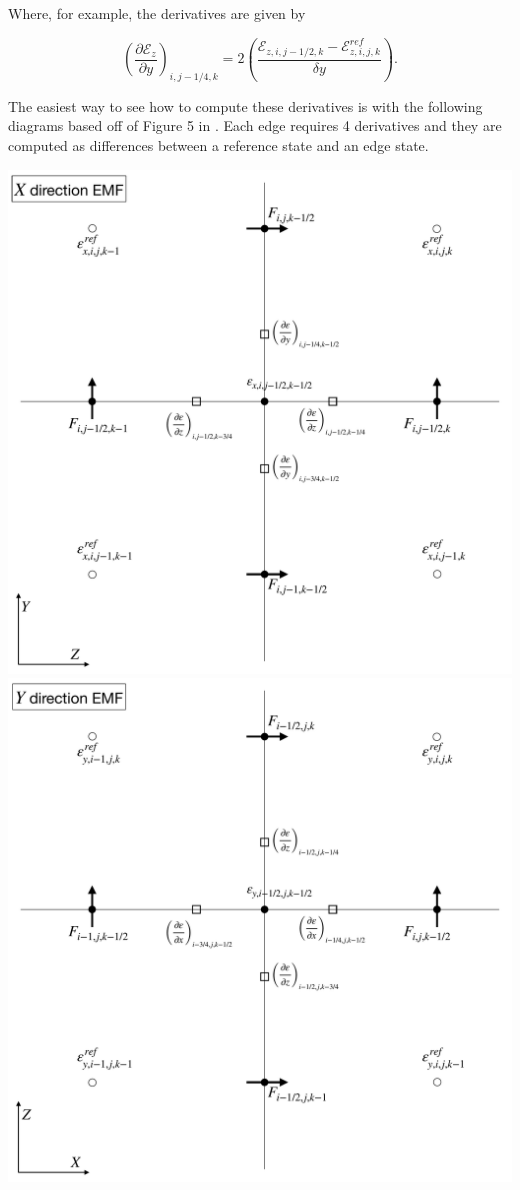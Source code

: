 Where, for example, the derivatives are given by

$$
    \left( \frac{\partial \mathcal{E}_z }{\partial y} \right)_{i, j-1/4, k} =
    2 \left( \frac{\mathcal{E}_{z,i,j-1/2,k} - \mathcal{E}_{z,i,j,k}^{ref}}{\delta y} \right).
$$

The easiest way to see how to compute these derivatives is with the following diagrams based off of Figure 5 in \citeyear[Stone et al.][]{stone_athena_2008}. Each edge requires 4 derivatives and they are computed as differences between a reference state and an edge state.

\includegraphics[scale=0.25]{Assets/2-methods/CT-edge-field-figures-X.pdf}
\includegraphics[scale=0.25]{Assets/2-methods/CT-edge-field-figures-Y.pdf}
